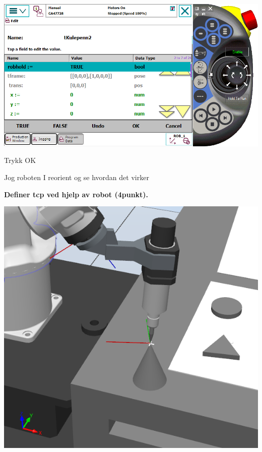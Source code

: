 \vspace{1cm}

\includegraphics[width=1\textwidth]{i04861x09}

Trykk OK

Jog roboten I reorient og se hvordan det virker

\vspace{1cm}


\textbf{Definer tcp ved hjelp av robot (4punkt).}

\vspace{1cm}

\includegraphics[width=1\textwidth]{i04861x10}

\vspace{1cm}

